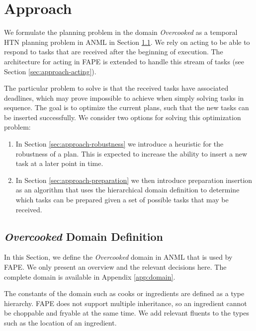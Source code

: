 \section{Approach}\label{sec:approach}


We formulate the planning problem in the domain \textit{Overcooked} as a temporal HTN planning problem in \ac{ANML} in Section \ref{sec:approach-domain}.
We rely on acting to be able to respond to tasks that are received after the beginning of execution.
The architecture for acting in \ac{FAPE} \cite{bit-monnotTemporalHierarchicalModels2016a} is extended to handle this stream of tasks (see Section \ref{sec:approach-acting}).

The particular problem to solve is that the received tasks have associated deadlines, which may prove impossible to achieve when simply solving tasks in sequence.
The goal is to optimize the current plans, such that the new tasks can be inserted successfully.
We consider two options for solving this optimization problem:

\begin{enumerate}
    \item In Section \ref{sec:approach-robustness} we introduce a heuristic for the robustness of a plan. 
    This is expected to increase the ability to insert a new task at a later point in time.
    \item In Section \ref{sec:approach-preparation} we then introduce preparation insertion as an algorithm that uses the hierarchical domain definition to determine which tasks can be prepared given a set of possible tasks that may be received.
\end{enumerate}

\subsection{\textit{Overcooked} Domain Definition}
\label{sec:approach-domain}

In this Section, we define the \textit{Overcooked} domain in \ac{ANML} \cite{smithANMLLanguage2008} that is used by FAPE.
We only present an overview and the relevant decisions here.
The complete domain is available in Appendix \ref{app:domain}.

The constants of the domain such as cooks or ingredients are defined as a type hierarchy.
\ac{FAPE} does not support multiple inheritance, so an ingredient cannot be choppable and fryable at the same time.
We add relevant fluents to the types such as the location of an ingredient.

